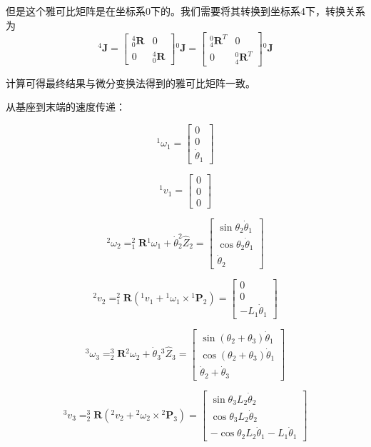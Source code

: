\documentclass{homework}
\begin{document}
\begin{sol}
但是这个雅可比矩阵是在坐标系{0}下的。我们需要将其转换到坐标系{4}下，转换关系为
\[
  {^4}\mathbf{J} =
  \begin{bmatrix}
    {^4_0}\mathbf{R} & 0 \\
    0 & {^4_0}\mathbf{R}
  \end{bmatrix}
  {^0}\mathbf{J} =
  \begin{bmatrix}
    {^0_4}\mathbf{R}^T & 0 \\
    0 & {^0_4}\mathbf{R}^T
  \end{bmatrix}
  {^0}\mathbf{J}
\]

计算可得最终结果与微分变换法得到的雅可比矩阵一致。

从基座到末端的速度传递：

\[
  {^1}\omega_1 = 
  \begin{bmatrix}
    0 \\
    0 \\
    \dot{\theta}_1
  \end{bmatrix}
\]

\[
  {^1}v_1 = 
  \begin{bmatrix}
    0 \\
    0 \\
    0
  \end{bmatrix}
\]

\[
  {^2}\omega_2 = _1^2\mathbf{R} {^1}\omega_1 + \dot{\theta}_2 ^2\hat{Z}_2 =
  \begin{bmatrix}
    \sin\theta_2 \dot{\theta}_1 \\
    \cos\theta_2 \dot{\theta}_1 \\
    \dot{\theta}_2
  \end{bmatrix}
\]

\[
  {^2}v_2 = _1^2\mathbf{R} ({^1}v_1 + {^1}\omega_1 \times {^1}\mathbf{P}_2) =
  \begin{bmatrix}
    0 \\
    0 \\
    -L_1 \dot{\theta}_1
  \end{bmatrix}
\]

\[
  {^3}\omega_3 = _2^3\mathbf{R} {^2}\omega_2 + \dot{\theta}_3 {^3}\hat{Z}_3 =
  \begin{bmatrix}
    \sin(\theta_2 + \theta_3) \dot{\theta}_1 \\
    \cos(\theta_2 + \theta_3) \dot{\theta}_1 \\
    \dot{\theta}_2 + \dot{\theta}_3
  \end{bmatrix}
\]

\[
  {^3}v_3 = _2^3\mathbf{R} ({^2}v_2 + {^2}\omega_2 \times {^2}\mathbf{P}_3) =
  \begin{bmatrix}
    \sin\theta_3 L_2 \dot{\theta}_2 \\
    \cos\theta_3 L_2 \dot{\theta}_2 \\
    -\cos\theta_2 L_2 \dot{\theta}_1 - L_1 \dot{\theta}_1
  \end{bmatrix}
\]


\end{sol}
\end{document}
